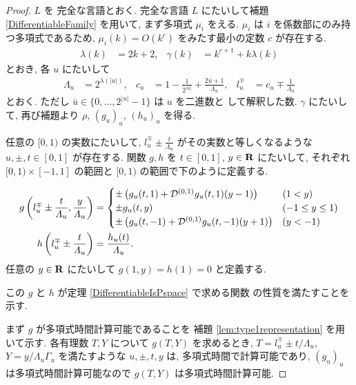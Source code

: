 \begin{proof}
 $L$ を \PSPACE 完全な言語とおく.
 \PSPACE 完全な言語 $L$ にたいして補題 \ref{DifferentiableFamily} を用いて,
 まず多項式 $\mu_i$ をえる.
 $\mu_i$ は $i$ を係数部にのみ持つ多項式であるため,
 $\mu_i(k) = O(k^c)$ をみたす最小の定数 $c$ が存在する.
 \begin{align}
  \lambda(k) &= 2k + 2,&
  \gamma(k) &= k^{c+1} + k \lambda(k)
 \end{align}
 とおき, 各 $u$ にたいして 
\begin{align}
 \Lambda_u 
 &= 2^{\lambda(|u|)}, &
 c_u 
 &= 1-\frac{1}{2^{|u|}}+\frac{2\bar{u}+1}{\Lambda_u}, &
 l_u^\mp 
 &= c_u\mp\frac{1}{\varLambda_u} 
\end{align}  
 とおく. ただし $\bar u \in \{0, \dots, 2^{|u|} - 1\}$ は $u$ を二進数と
 して解釈した数.
 $\gamma$ にたいして, 再び補題より $\rho$, $(g_u)_u$, $(h_u)_u$ を得る.



 任意の $[0,1)$ の実数にたいして,
 $l^\mp_u \pm \frac{t}{\Lambda_u}$ がその実数と等しくなるような
 $u, \pm, t\in [0,1]$ が存在する.
 関数 $g, h$ を $t \in [0,1]$, $y \in \mathbf R$ にたいして,
 それぞれ $[0,1) \times [-1,1]$ の範囲と $[0,1)$ の範囲で下のように定義する.

 \begin{align}
  g\left(l^\mp_u \pm \frac{t}{\varLambda_u}, \frac{y}{\varLambda_u}\right)
  &= \begin{cases}
      \pm \left( g_u(t,1) 
      + \mathcal D^{(0,1)}g_u(t, 1)(y-1) \right)&  (1<y)\\
      \pm g_u(t, y) & (-1 \le y \le 1) \\
      \pm \left( g_u(t, -1) + \mathcal D^{(0,1)} g_u(t, -1)(y+1) \right) & (y<-1)
     \end{cases}
  \\
  h \left( l^\mp_u \pm \frac{t}{\varLambda_u} \right) 
  &= \frac{h_u(t)}{\varLambda_u}.
\end{align}
 任意の $y \in \mathbf R$ にたいして $g(1,y) = h(1) = 0$ と定義する.



 この $g$ と $h$ が定理 \ref{DifferentiableIsPspace} で求める関数
 の性質を満たすことを示す.


 
 まず $g$ が多項式時間計算可能であることを
 補題 \ref{lem:type1representation} を用いて示す.
 各有理数 $T,Y$ について $g(T, Y)$ を求めるとき,
 $T=l_u^\mp \pm t/\Lambda_u$, $Y = y/\Lambda_u\Gamma_u$ を満たすような
 $u, \pm, t, y$ は, 多項式時間で計算可能であり,
 $(g_u)_u$ は多項式時間計算可能なので $g(T, Y)$ は多項式時間計算可能.




\end{proof}
